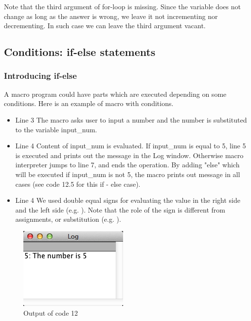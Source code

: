 

Note that the third argument of for-loop is missing. Since the variable
 does not change as long as the answer is wrong, we leave it not
incrementing nor decrementing. In such case we can leave the third argument
vacant. 

\subsection{Conditions: if-else statements}
\subsubsection{Introducing if-else}
A macro program could have parts which are executed depending on some
conditions.
Here is an example of macro with conditions.

\begin{itemize}
\item Line 3 The macro asks user to input a number and the number is substituted to the variable input\_num.
\item Line 4 Content of input\_num is evaluated. If input\_num is equal to 5, line 5 is executed and prints out the message in the Log window. Otherwise macro interpreter jumps to line 7, and ends the operation.  By adding "else" which will be executed if input\_num is not 5, the macro prints out message in all cases (see code 12.5 for this if - else case). 
\item Line 4 We used double equal signs for evaluating the value in the right side and the left side (e.g. ). 
Note that the role of the sign \ilcom{=} is different from assignments, or substitution (e.g. ).
\end{itemize}
\begin{figure}[htbp]
\begin{center}
\includegraphics[scale=0.6]{fig/fig2341_code12out.png}
\caption{Output of code 12}
\label{fig:code12 output}
\end{center}
\end{figure} 

